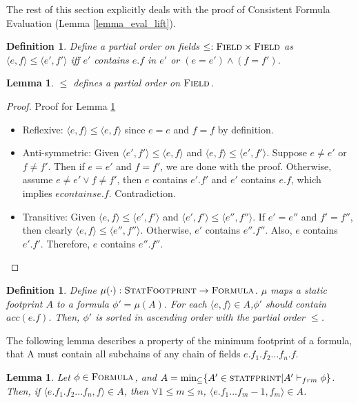 \documentclass {article}
\newtheorem{lemma}[theorem]{Lemma}
\newtheorem{definition}[theorem]{Definition}
\newcommand{\frm}{\vdash_{frm}}
\newcommand{\formula}{\textsc{Formula}}
\newcommand{\statfprint}{\textsc{StatFootprint}}
\begin{document}
The rest of this section explicitly deals with the proof of Consistent Formula Evaluation (Lemma \ref{lemma_eval_lift}). 
\begin{definition}
Define a partial order on fields $\leq : \textsc{Field} \times \textsc{Field}$ as $\langle e,f\rangle \leq \langle e',f'\rangle$ iff $e'$ contains $e.f$ in $e'$ or $(e = e') \wedge (f = f')$.
\end{definition}

\begin{lemma}
\label{lemma_field_poset}
$\leq$ defines a partial order on $\textsc{Field}$.
\end{lemma}
\begin{proof} Proof for Lemma \ref{lemma_field_poset}
\begin{itemize}
    \item Reflexive: $\langle e,f\rangle  \leq \langle e,f\rangle $ since $e = e$ and $f = f$ by definition.
    \item Anti-symmetric: Given $\langle e',f'\rangle  \leq \langle e,f\rangle $ and $\langle e,f\rangle  \leq \langle e',f'\rangle $. Suppose $e \neq e'$ or $f \neq f'$. Then if $e = e'$ and $f = f'$, we are done with the proof. Otherwise, assume $e \neq e' \vee f \neq f'$, then $e$ contains $e'.f'$ and $e'$ contains $e.f$, which implies $e contains e.f$. Contradiction. 
    \item Transitive: Given $\langle e,f\rangle  \leq \langle e',f'\rangle $ and $\langle e',f'\rangle  \leq \langle e'',f''\rangle $. If $e' = e''$ and $f' = f''$, then clearly $\langle e,f\rangle  \leq \langle e'',f''\rangle $. Otherwise, $e'$ contains $e''.f''$. Also, $e$ contains $e'.f'$. Therefore, $e$ contains $e''.f''$.
\end{itemize}
\end{proof}
\begin{definition}
\label{def_mu}
Define $\mu(\cdot) : \statfprint \rightarrow \formula$. $\mu$ maps a static footprint $A$ to a formula $\phi' = \mu(A)$. For each $\langle e,f \rangle \in A$,$\phi'$ should contain $acc(e.f)$. Then, $\phi'$ is sorted in ascending order with the partial order $\leq$.\\
\end{definition}

The following lemma describes a property of the minimum footprint of a formula, that A must contain all subchains of any chain of fields $e.f_1.f_2...f_n.f$.\\

\begin{lemma}
\label{lemma_frm_chain} 
Let $\phi \in \formula$, and $A = \min_{\subseteq}\{A' \in \textsc{statfprint} | A' \frm \phi\}$. Then, if $\langle e.f_1.f_2...f_n, f \rangle \in A$, then $\forall 1 \leqslant m \leqslant n$, $\langle e.f_1...f_m-1, f_m \rangle \in A$. 
\end{lemma}
\end{document}
